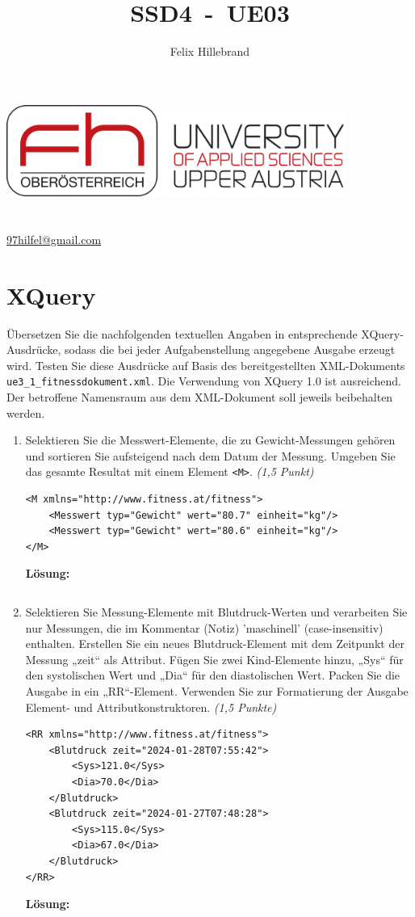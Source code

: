 \documentclass[a4paper,11pt]{report}
\author{Felix Hillebrand}
\makeatletter
\newcommand{\coverpage}{
    \thispagestyle{cover}
    \begin{center}
        {\includegraphics[height=3cm]{fh-logo}}\\[1cm]
        {\LARGE \thetitle}\\[0.5cm]
        {\large \theauthor}\\
        \href{mailto:97hilfel@gmail.com}{97hilfel@gmail.com}\\
    \end{center}
    \tableofcontents
    \clearpage
}
\makeatother
\begin{document}
\title{SSD4~-~UE03}
\coverpage

\clearpage
{}
\pagestyle{main}

\chapter{XQuery}
    Übersetzen Sie die nachfolgenden textuellen Angaben in entsprechende XQuery-Ausdrücke,
    sodass die bei jeder Aufgabenstellung angegebene Ausgabe erzeugt wird. 
    Testen Sie diese Ausdrücke auf Basis des bereitgestellten XML-Dokuments \texttt{ue3\_1\_fitnessdokument.xml}. 
    Die Verwendung von XQuery 1.0 ist ausreichend. 
    Der betroffene Namensraum aus dem XML-Dokument soll jeweils beibehalten werden.

    \begin{enumerate}[1.]
    \item Selektieren Sie die Messwert-Elemente,
    die zu Gewicht-Messungen gehören und sortieren Sie aufsteigend nach dem Datum der Messung.
    Umgeben Sie das gesamte Resultat mit einem Element \texttt{<M>}.
    \textit{(1,5 Punkt)}

    \begin{verbatim}
<M xmlns="http://www.fitness.at/fitness">
    <Messwert typ="Gewicht" wert="80.7" einheit="kg"/>
    <Messwert typ="Gewicht" wert="80.6" einheit="kg"/>
</M>
    \end{verbatim}
    \textbf{Lösung:}
    \inputminted[frame=lines, breaklines, linenos]{xquery}{assets/ue3_1_1.xq}
    \newpage

    \item Selektieren Sie Messung-Elemente mit Blutdruck-Werten und verarbeiten Sie nur
    Messungen, die im Kommentar (Notiz) 'maschinell' (case-insensitiv) enthalten. Erstellen
    Sie ein neues Blutdruck-Element mit dem Zeitpunkt der Messung „zeit“ als Attribut.
    Fügen Sie zwei Kind-Elemente hinzu, „Sys“ für den systolischen Wert und „Dia“ für den
    diastolischen Wert. Packen Sie die Ausgabe in ein „RR“-Element. Verwenden Sie zur
    Formatierung der Ausgabe Element- und Attributkonstruktoren. \textit{(1,5 Punkte)}
    \begin{verbatim}
<RR xmlns="http://www.fitness.at/fitness">
    <Blutdruck zeit="2024-01-28T07:55:42">
        <Sys>121.0</Sys>
        <Dia>70.0</Dia>
    </Blutdruck>
    <Blutdruck zeit="2024-01-27T07:48:28">
        <Sys>115.0</Sys>
        <Dia>67.0</Dia>
    </Blutdruck>
</RR>
    \end{verbatim}
    \textbf{Lösung:}
    \inputminted[frame=lines, breaklines, linenos]{xquery}{assets/ue3_1_2.xq}
    \newpage


\end{enumerate}
\end{document}
